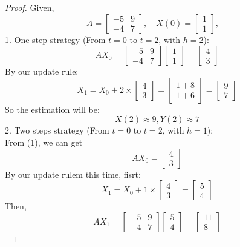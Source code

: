 \documentclass{article}
\begin{document}
\begin{proof}
    Given,
    \[ A = 
        \begin{bmatrix}
            -5 & 9 \\ -4 & 7
        \end{bmatrix},
        \quad
        X(0) = 
        \begin{bmatrix}
            1 \\ 1
        \end{bmatrix},
        \quad
    \]
    1. One step strategy (From $t = 0$ to $t = 2$, with $h = 2$):
    \\
    \[ AX_0 = \begin{bmatrix} -5 & 9 \\ -4 & 7 \end{bmatrix} \begin{bmatrix} 1 \\ 1 \end{bmatrix} = \begin{bmatrix} 4 \\ 3 \end{bmatrix} \]
    By our update rule:
    \[ X_1 = X_0 + 2 \times \begin{bmatrix} 4 \\ 3 \end{bmatrix} = \begin{bmatrix} 1 + 8 \\ 1 + 6 \end{bmatrix} = \begin{bmatrix} 9 \\ 7 \end{bmatrix} \]
    So the estimation will be:
    \[ X(2) \approx 9, Y(2) \approx 7 \]
    2. Two steps strategy (From $t = 0$ to $t = 2$, with $h = 1$):
    \\
    From (1), we can get
    \[ AX_0 = \begin{bmatrix} 4 \\ 3 \end{bmatrix} \]
    By our update rulem this time, fisrt:
    \[ X_1 = X_0 + 1 \times \begin{bmatrix} 4 \\ 3 \end{bmatrix} = \begin{bmatrix} 5 \\ 4 \end{bmatrix} \]
    Then,
    \[ AX_1 = \begin{bmatrix} -5 & 9 \\ -4 & 7 \end{bmatrix} \begin{bmatrix} 5 \\ 4 \end{bmatrix} = \begin{bmatrix} 11 \\ 8\end{bmatrix} \]

\end{proof}
\end{document}
